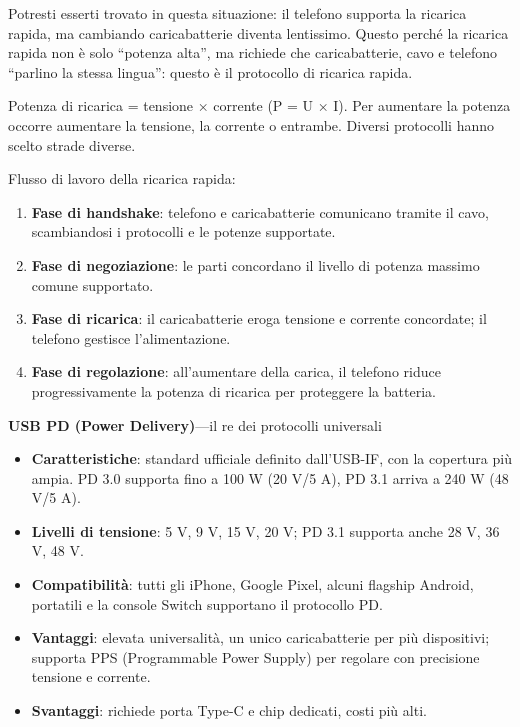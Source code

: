 
Potresti esserti trovato in questa situazione: il telefono supporta la ricarica rapida, ma cambiando caricabatterie diventa lentissimo. Questo perché la ricarica rapida non è solo “potenza alta”, ma richiede che caricabatterie, cavo e telefono “parlino la stessa lingua”: questo è il protocollo di ricarica rapida.


Potenza di ricarica = tensione × corrente (P = U × I). Per aumentare la potenza occorre aumentare la tensione, la corrente o entrambe. Diversi protocolli hanno scelto strade diverse.

Flusso di lavoro della ricarica rapida:

\begin{enumerate}
  \item \textbf{Fase di handshake}: telefono e caricabatterie comunicano tramite il cavo, scambiandosi i protocolli e le potenze supportate.
  \item \textbf{Fase di negoziazione}: le parti concordano il livello di potenza massimo comune supportato.
  \item \textbf{Fase di ricarica}: il caricabatterie eroga tensione e corrente concordate; il telefono gestisce l'alimentazione.
  \item \textbf{Fase di regolazione}: all'aumentare della carica, il telefono riduce progressivamente la potenza di ricarica per proteggere la batteria.
\end{enumerate}


\textbf{USB PD (Power Delivery)}—il re dei protocolli universali

\begin{itemize}
  \item \textbf{Caratteristiche}: standard ufficiale definito dall'USB-IF, con la copertura più ampia. PD 3.0 supporta fino a 100 W (20 V/5 A), PD 3.1 arriva a 240 W (48 V/5 A).
  \item \textbf{Livelli di tensione}: 5 V, 9 V, 15 V, 20 V; PD 3.1 supporta anche 28 V, 36 V, 48 V.
  \item \textbf{Compatibilità}: tutti gli iPhone, Google Pixel, alcuni flagship Android, portatili e la console Switch supportano il protocollo PD.
  \item \textbf{Vantaggi}: elevata universalità, un unico caricabatterie per più dispositivi; supporta PPS (Programmable Power Supply) per regolare con precisione tensione e corrente.
  \item \textbf{Svantaggi}: richiede porta Type-C e chip dedicati, costi più alti.
\end{itemize}

